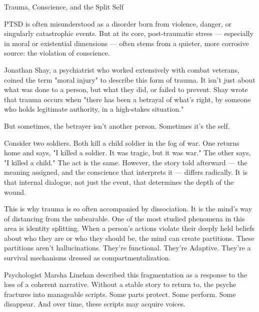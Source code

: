\begin{PsychologicalSidebar}{Trauma, Conscience, and the Split Self}

PTSD is often misunderstood as a disorder born from violence, danger, or singularly catastrophic 
events. But at its core, post-traumatic stress --- especially in moral or existential dimensions --- 
often stems from a quieter, more corrosive source: the violation of conscience.

\medskip

Jonathan Shay, a psychiatrist who worked extensively with combat veterans, coined the term 
"moral injury" to describe this form of trauma. It isn’t just about what was done to a person, but what 
they did, or failed to prevent. Shay wrote that trauma occurs when "there has been a betrayal of 
what’s right, by someone who holds legitimate authority, in a high-stakes situation."

\medskip


But sometimes, the betrayer isn’t another person. Sometimes it’s the self.

\medskip


Consider two soldiers. Both kill a child soldier in the fog of war. One returns home and says, "I 
killed a soldier. It was tragic, but it was war." The other says, "I killed a child." The act is the same. 
However, the story told afterward --- the meaning assigned, and the conscience that interprets it
--- differs radically. It is that internal dialogue, not just the event, that determines the depth 
of the wound.

\medskip


This is why trauma is so often accompanied by dissociation. It is the mind’s way of distancing from the 
unbearable. One of the most studied phenomena in this area is identity splitting. When a person's actions 
violate their deeply held beliefs about who they are or who they should be, the mind can create 
partitions. These partitions aren’t hallucinations. They’re functional. They're Adaptive. 
They're a survival mechanisms dressed as compartmentalization.

\medskip


Psychologist Marsha Linehan described this fragmentation as a response to the loss of a coherent 
narrative. Without a stable story to return to, the psyche fractures into manageable scripts. Some 
parts protect. Some perform. Some disappear. And over time, these scripts may acquire voices.

\medskip



\end{PsychologicalSidebar}
